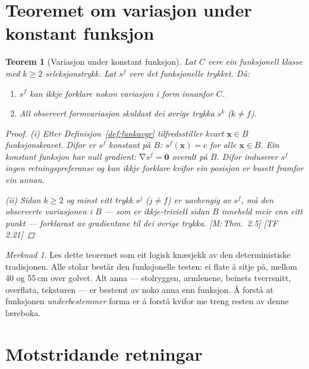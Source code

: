 \documentclass[10pt]{book}
\theoremstyle{definition}
\theoremstyle{plain}
\newtheorem{teorem}[definisjon]{Teorem}
\theoremstyle{remark}
\newtheorem{merknad}[definisjon]{Merknad}
\DeclareMathOperator{\grad}{\nabla}
\newcommand{\TF}[1]{\textnormal{[TF\,#1]}}
\newcommand{\Mref}[1]{\textnormal{[M:\,#1]}}
\begin{document}
\section{Teoremet om variasjon under konstant funksjon}\label{sec:seleksjon:variasjon}

\begin{teorem}[Variasjon under konstant funksjon]\label{thm:variasjon}
Lat $C$ vere ein funksjonell klasse med $k \geq 2$ seleksjonstrykk. Lat $s^f$ vere det funksjonelle trykket. D\aa:
\begin{enumerate}[label=(\roman*)]
  \item $s^f$ kan ikkje forklare nokon variasjon i form innanfor $C$.
  \item All observert formvariasjon skuldast dei \o vrige trykka $s^k$ ($k \neq f$).
\end{enumerate}

\begin{proof}
\textit{(i)} Etter Definisjon~\ref{def:funkavgr} tilfredsstiller kvart $\bm{x} \in B$ funksjonskravet. Difor er $s^f$ konstant p\aa{} $B$: $s^f(\bm{x}) = c$ for alle $\bm{x} \in B$. Ein konstant funksjon har null gradient: $\grad s^f = \bm{0}$ overalt p\aa{} $B$. Difor induserer $s^f$ ingen retningspreferanse og kan ikkje forklare kvifor ein posisjon er busett framfor ein annan.

\textit{(ii)} Sidan $k \geq 2$ og minst eitt trykk $s^j$ ($j \neq f$) er uavhengig av $s^f$, m\aa{} den observerte variasjonen i $B$ --- som er ikkje-triviell sidan $B$ inneheld meir enn eitt punkt --- forklarast av gradientane til dei \o vrige trykka. \Mref{Thm.~2.5} \TF{2.21}
\end{proof}
\end{teorem}

\begin{merknad}
Les dette teoremet som eit logisk kn\ae sjekk av den deterministiske tradisjonen. Alle stolar best\aa r den funksjonelle testen: ei flate \aa{} sitje p\aa, mellom 40 og 55\,cm over golvet. Alt anna --- stolryggen, armlenene, beinets tverrsnitt, overflata, teksturen --- er bestemt av noko anna enn funksjon. \AA{} forst\aa{} at funksjonen \emph{underbestemmer} forma er \aa{} forst\aa{} kvifor me treng resten av denne l\ae reboka.
\end{merknad}

\section{Motstridande retningar}\label{sec:seleksjon:motstr}
\end{document}
